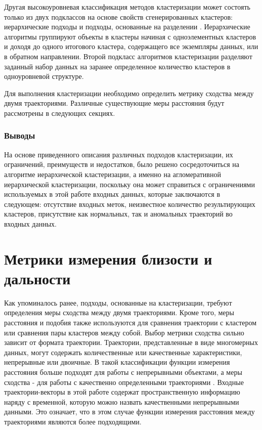 \bigbreak

Другая высокоуровневая классификация методов кластеризации может состоять только из двух подклассов на основе свойств сгенерированных кластеров: иерархические подходы и подходы, основанные на разделении \cite{article:23_survey_ca}. Иерархические алгоритмы группируют объекты в кластеры начиная с одноэлементных кластеров и доходя до одного итогового кластера, содержащего все экземпляры данных, или в обратном направлении. Второй подкласс алгоритмов кластеризации разделяют заданный набор данных на заранее определенное количество кластеров в одноуровневой структуре.

Для выполнения кластеризации необходимо определить метрику сходства между двумя траекториями. Различные существующие меры расстояния будут рассмотрены в следующих секциях.

\subsubsection{Выводы}

На основе приведенного описания различных подходов кластеризации, их ограничений, преимуществ и недостатков, было решено сосредоточиться на алгоритме иерархической кластеризации, а именно на агломеративной иерархической кластеризации, поскольку она может справиться с ограничениями используемых в этой работе входных данных, которые заключаются в следующем: отсутствие входных меток, неизвестное количество результирующих кластеров, присутствие как нормальных, так и аномальных траекторий во входных данных.

\section{Метрики измерения близости и дальности}

Как упоминалось ранее, подходы, основанные на кластеризации, требуют определения меры сходства между двумя траекториями. Кроме того, меры расстояния и подобия также используются для сравнения траектории с кластером или сравнения пары кластеров между собой. Выбор метрики сходства сильно зависит от формата траектории. Траектории, представленные в виде многомерных данных, могут содержать количественные или качественные характеристики, непрерывные или двоичные. В такой классификации функции измерения расстояния больше подходят для работы с непрерывными объектами, а меры сходства - для работы с качественно определенными траекториями \cite{article:23_survey_ca}. Входные траектории-векторы в этой работе содержат пространственную информацию наряду с временной, которую можно назвать качественными непрерывными данными. Это означает, что в этом случае функции измерения расстояния между траекториями являются более подходящими. 

